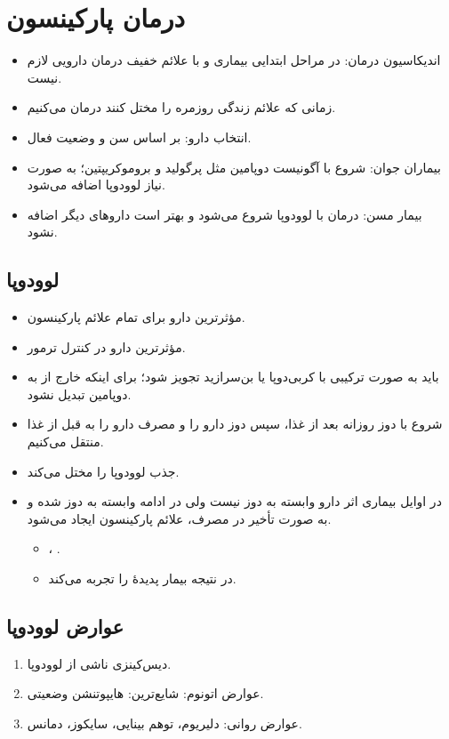 \documentclass[a4paper,12pt]{extbook}
\begin{document}
\section*{درمان پارکینسون}
\begin{itemize}
\item اندیکاسیون درمان: در مراحل ابتدایی بیماری و با علائم خفیف درمان دارویی لازم نیست.
\item زمانی که علائم زندگی روزمره را مختل کنند درمان می‌کنیم.
\item انتخاب دارو: بر اساس سن و وضعیت فعال.
\item بیماران جوان: شروع با آگونیست دوپامین مثل پرگولید و بروموکریپتین؛ به صورت نیاز لوودوپا اضافه می‌شود.
\item بیمار مسن: درمان با لوودوپا شروع می‌شود و بهتر است داروهای دیگر اضافه نشود.
\end{itemize}
\subsection*{لوودوپا}
\begin{itemize}
\item مؤثرترین دارو برای تمام علائم پارکینسون.
\item مؤثرترین دارو در کنترل ترمور.
\item باید به صورت ترکیبی با کربی‌دوپا یا بن‌سرازید تجویز شود؛ برای اینکه خارج از  به دوپامین تبدیل نشود.
\item شروع با دوز  روزانه بعد از غذا، سپس دوز دارو را \MDen{$\uparrow$} و مصرف دارو را به قبل از غذا منتقل می‌کنیم.
\item {} جذب لوودوپا را مختل می‌کند.
\item در اوایل بیماری اثر دارو وابسته به دوز نیست ولی در ادامه وابسته به دوز شده و به صورت تأخیر در مصرف، علائم پارکینسون ایجاد می‌شود.
\begin{itemize}
\item {}، .
\item در نتیجه بیمار پدیدهٔ  را تجربه می‌کند.
\end{itemize}
\end{itemize}
\subsection*{عوارض لوودوپا}
\begin{enumerate}[label=\alph*)]
\item دیس‌کینزی ناشی از لوودوپا.
\item عوارض اتونوم: شایع‌ترین: هایپوتنشن وضعیتی.
\item عوارض روانی: دلیریوم، توهم بینایی، سایکوز، دمانس.
\end{enumerate}
\end{document}

